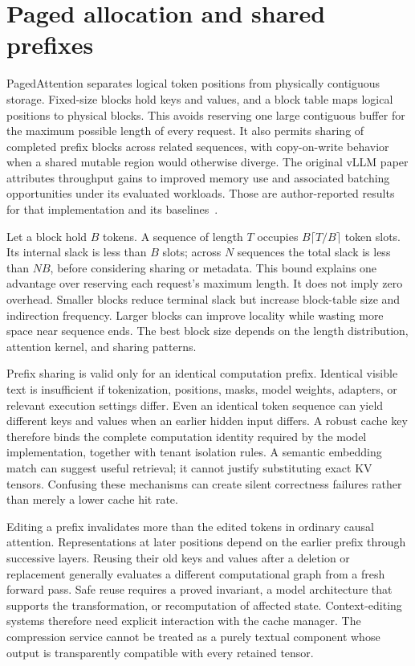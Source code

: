\section{Paged allocation and shared prefixes}
\label{sec:C04:paging}
PagedAttention separates logical token positions from physically contiguous storage. Fixed-size blocks hold keys and values, and a block table maps logical positions to physical blocks. This avoids reserving one large contiguous buffer for the maximum possible length of every request. It also permits sharing of completed prefix blocks across related sequences, with copy-on-write behavior when a shared mutable region would otherwise diverge. The original vLLM paper attributes throughput gains to improved memory use and associated batching opportunities under its evaluated workloads. Those are author-reported results for that implementation and its baselines~\cite{kwon2023pagedattention}.

Let a block hold $B$ tokens. A sequence of length $T$ occupies $B\lceil T/B\rceil$ token slots. Its internal slack is less than $B$ slots; across $N$ sequences the total slack is less than $NB$, before considering sharing or metadata. This bound explains one advantage over reserving each request's maximum length. It does not imply zero overhead. Smaller blocks reduce terminal slack but increase block-table size and indirection frequency. Larger blocks can improve locality while wasting more space near sequence ends. The best block size depends on the length distribution, attention kernel, and sharing patterns.

Prefix sharing is valid only for an identical computation prefix. Identical visible text is insufficient if tokenization, positions, masks, model weights, adapters, or relevant execution settings differ. Even an identical token sequence can yield different keys and values when an earlier hidden input differs. A robust cache key therefore binds the complete computation identity required by the model implementation, together with tenant isolation rules. A semantic embedding match can suggest useful retrieval; it cannot justify substituting exact KV tensors. Confusing these mechanisms can create silent correctness failures rather than merely a lower cache hit rate.

Editing a prefix invalidates more than the edited tokens in ordinary causal attention. Representations at later positions depend on the earlier prefix through successive layers. Reusing their old keys and values after a deletion or replacement generally evaluates a different computational graph from a fresh forward pass. Safe reuse requires a proved invariant, a model architecture that supports the transformation, or recomputation of affected state. Context-editing systems therefore need explicit interaction with the cache manager. The compression service cannot be treated as a purely textual component whose output is transparently compatible with every retained tensor.

